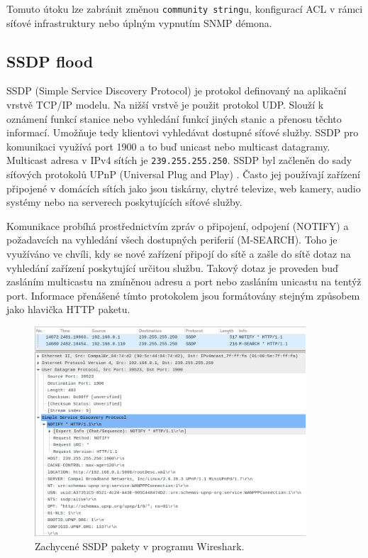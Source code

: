 Tomuto útoku lze zabránit změnou \texttt{community string}u, konfigurací ACL v rámci síťové infrastruktury nebo úplným vypnutím SNMP démona.

\subsection{SSDP flood}
\label{subsec:ssdp_flood}
SSDP (Simple Service Discovery Protocol) je protokol definovaný na aplikační vrstvě TCP/IP modelu. Na nižší vrstvě je použit protokol UDP. Slouží k oznámení funkcí stanice nebo vyhledání funkcí jiných stanic a přenosu těchto informací. Umožňuje tedy klientovi vyhledávat dostupné síťové služby. SSDP pro komunikaci využívá port 1900 a to buď unicast nebo multicast datagramy. Multicast adresa v IPv4 sítích je \texttt{239.255.255.250}. SSDP byl začleněn do sady síťových protokolů UPnP (Universal Plug and Play) \cite{Kopecky2007}.
Často jej používají zařízení připojené v domácích sítích jako jsou tiskárny, chytré televize, web kamery, audio systémy nebo na serverech poskytujících síťové služby.

Komunikace probíhá prostřednictvím zpráv o připojení, odpojení (NOTIFY) a požadavcích na vyhledání všech dostupných periferií (M-SEARCH). Toho je využíváno ve chvíli, kdy se nové zařízení připojí do sítě a zašle do sítě dotaz na vyhledání zařízení poskytující určitou službu. Takový dotaz je proveden buď zasláním multicastu na zmíněnou adresu a port nebo zasláním unicastu na tentýž port. Informace přenášené tímto protokolem jsou formátovány stejným způsobem jako hlavička HTTP paketu.

\begin{figure}[!h]
	\begin{center}
		\includegraphics[width=0.9\textwidth]{obrazky/ssdp_packets_wireshark.png}
	\end{center}
	\caption{Zachycené SSDP pakety v programu Wireshark.}
	\label{fig:ssdp-packets-wireshark}
\end{figure}

